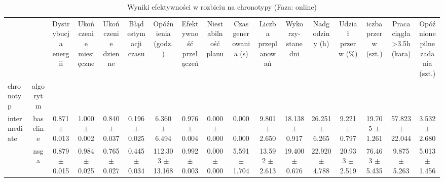 
\begin{table}[htbp]
\caption{Wyniki efektywności w rozbiciu na chronotypy (Faza: online)}
\label{tab:online_by_chronotype}
\begin{tabular}{|l|c|c|c|c|c|c|c|c|c|c|c|c|c|c|c|c|}
\toprule
 &  & \makecell{Dystrybucja\\energii} & \makecell{Ukończenie\\miesięczne} & \makecell{Ukończenie\\dzienne} & \makecell{Błąd\\estymacji\\czasu} & \makecell{Opóźnienia\\(godz.)} & \makecell{Efektywność\\przełączeń} & \makecell{Niestabilność\\planu} & \makecell{Czas\\generowania (s)} & \makecell{Liczba\\przeplanowań} & \makecell{Wykorzy-\\stane dni} & Nadgodziny (h) & \makecell{Udział\\przerw (\%)} & \makecell{iczba\\przerw (szt.)} & \makecell{Praca ciągła\\>3.5h (kara)} & \makecell{Opóźnione\\pilne\\zadania (szt.)} \\
chronotyp & algorytm &  &  &  &  &  &  &  &  &  &  &  &  &  &  &  \\
\midrule
\multirow[t]{3}{*}{intermediate} & baseline & 0.871 $\pm$ 0.013 & 1.000 $\pm$ 0.002 & 0.840 $\pm$ 0.037 & 0.196 $\pm$ 0.025 & 6.360 $\pm$ 6.494 & 0.976 $\pm$ 0.004 & 0.000 $\pm$ 0.000 & 0.000 $\pm$ 0.000 & 9.801 $\pm$ 2.650 & 18.138 $\pm$ 0.917 & 26.251 $\pm$ 6.265 & 9.221 $\pm$ 0.797 & 19.705 $\pm$ 1.261 & 57.823 $\pm$ 22.044 & 3.532 $\pm$ 2.680 \\
 & nsga & 0.879 $\pm$ 0.015 & 0.984 $\pm$ 0.025 & 0.765 $\pm$ 0.027 & 0.445 $\pm$ 0.034 & 112.303 $\pm$ 13.168 & 0.992 $\pm$ 0.003 & 0.000 $\pm$ 0.000 & 5.591 $\pm$ 1.704 & 13.592 $\pm$ 2.613 & 19.400 $\pm$ 0.676 & 22.920 $\pm$ 4.788 & 20.933 $\pm$ 2.519 & 76.463 $\pm$ 5.435 & 9.875 $\pm$ 5.263 & 5.013 $\pm$ 1.456 \\

\end{tabular}
\end{table}
